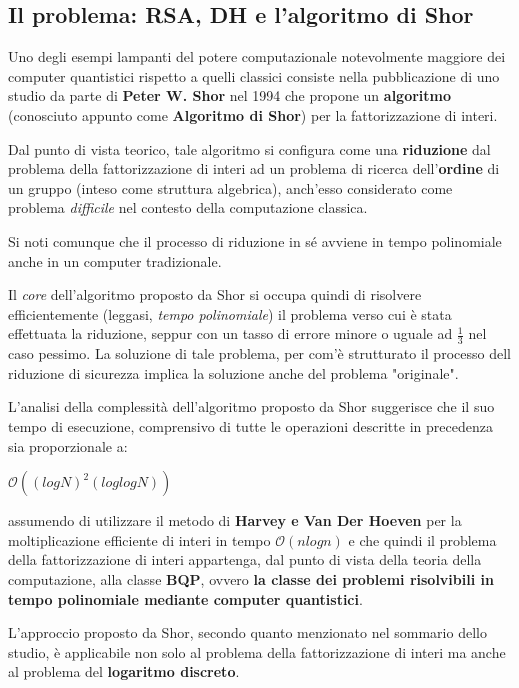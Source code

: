 \documentclass[a4paper, 12pt, oneside]{article}
\theoremstyle{definition}
\begin{document}
\newpage

\subsection{Il problema: RSA, DH e l'algoritmo di Shor}
Uno degli esempi lampanti del potere computazionale notevolmente maggiore dei computer quantistici rispetto a quelli classici consiste nella pubblicazione di uno studio \cite{365700} da parte di \textbf{Peter W. Shor} nel 1994 che propone un \textbf{algoritmo} (conosciuto appunto come \textbf{Algoritmo di Shor}) per la fattorizzazione di interi.

Dal punto di vista teorico, tale algoritmo si configura come una \textbf{riduzione} dal problema della fattorizzazione di interi ad un problema di ricerca dell'\textbf{ordine} di un gruppo (inteso come struttura algebrica), anch'esso considerato come problema \textit{difficile} nel contesto della computazione classica. 

Si noti comunque che il processo di riduzione in sé avviene in tempo polinomiale anche in un computer tradizionale. 

Il \textit{core} dell'algoritmo proposto da Shor si occupa quindi di risolvere efficientemente (leggasi, \textit{tempo polinomiale}) il problema verso cui è stata effettuata la riduzione, seppur con un tasso di errore minore o uguale ad $\frac{1}{3}$ nel caso pessimo. La soluzione di tale problema, per com'è strutturato il processo dell riduzione di sicurezza implica la soluzione anche del problema "originale".

L'analisi della complessità dell'algoritmo proposto da Shor suggerisce che il suo tempo di esecuzione, comprensivo di tutte le operazioni descritte in precedenza sia proporzionale a:

\begin{center}
    $\mathcal{O}((log{}N)^2 (log{}log{}N))$
\end{center}

assumendo di utilizzare il metodo di \textbf{Harvey e Van Der Hoeven} \cite{harvey:hal-02070778} per la moltiplicazione efficiente di interi in tempo $\mathcal{O}(n log{}n)$ e che quindi il problema della fattorizzazione di interi appartenga, dal punto di vista della teoria della computazione, alla classe \textbf{BQP}, ovvero \textbf{la classe dei problemi risolvibili in tempo polinomiale mediante computer quantistici}.

L'approccio proposto da Shor, secondo quanto menzionato nel sommario dello studio, è applicabile non solo al problema della fattorizzazione di interi ma anche al problema del \textbf{logaritmo discreto}.
\end{document}
